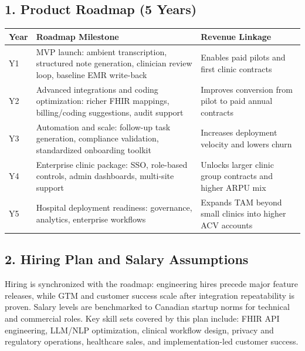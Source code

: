 \documentclass[11pt]{article}
\begin{document}
\subsection*{1. Product Roadmap (5 Years)}
\begin{center}
\begin{tabular}{p{} p{} p{}}
\toprule
\textbf{Year} & \textbf{Roadmap Milestone} & \textbf{Revenue Linkage} \\
\midrule
Y1 & MVP launch: ambient transcription, structured note generation, clinician review loop, baseline EMR write-back & Enables paid pilots and first clinic contracts \\
Y2 & Advanced integrations and coding optimization: richer FHIR mappings, billing/coding suggestions, audit support & Improves conversion from pilot to paid annual contracts \\
Y3 & Automation and scale: follow-up task generation, compliance validation, standardized onboarding toolkit & Increases deployment velocity and lowers churn \\
Y4 & Enterprise clinic package: SSO, role-based controls, admin dashboards, multi-site support & Unlocks larger clinic group contracts and higher ARPU mix \\
Y5 & Hospital deployment readiness: governance, analytics, enterprise workflows & Expands TAM beyond small clinics into higher ACV accounts \\
\bottomrule
\end{tabular}
\end{center}

\subsection*{2. Hiring Plan and Salary Assumptions}
Hiring is synchronized with the roadmap: engineering hires precede major feature releases, while GTM and customer success scale after integration repeatability is proven. Salary levels are benchmarked to Canadian startup norms for technical and commercial roles.
Key skill sets covered by this plan include: FHIR API engineering, LLM/NLP optimization, clinical workflow design, privacy and regulatory operations, healthcare sales, and implementation-led customer success.
\end{document}
